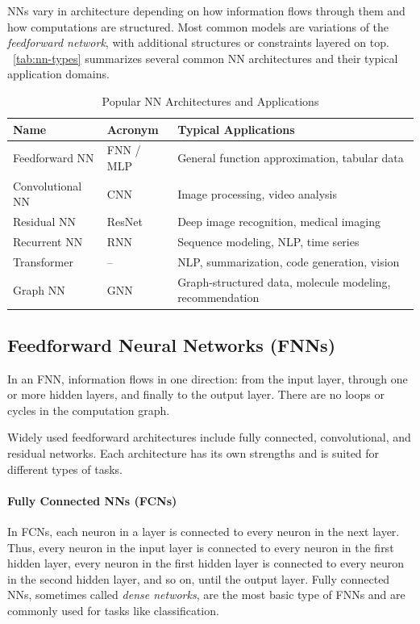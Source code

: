\documentclass[oneside,11pt,dvipsnames]{book}
\numberwithin{equation}{section}
\theoremstyle{definition}
\theoremstyle{remark}
\begin{document}
NNs vary in architecture depending on how information flows through them and how computations are structured. Most common models are variations of the \emph{feedforward network}, with additional structures or constraints layered on top. ~\autoref{tab:nn-types} summarizes several common NN architectures and their typical application domains.


\begin{table}[h]
\caption{Popular NN Architectures and Applications}\label{tab:nn-types}
\centering
\small
\begin{tabular}{llp{8cm}@{}}
\toprule
\textbf{Name} & \textbf{Acronym} & \textbf{Typical Applications} \\
\midrule
Feedforward NN & FNN / MLP & General function approximation, tabular data \\
Convolutional NN & CNN & Image processing, video analysis \\
Residual NN & ResNet & Deep image recognition, medical imaging \\
Recurrent NN & RNN & Sequence modeling, NLP, time series \\
Transformer & -- & NLP, summarization, code generation, vision \\
Graph NN & GNN & Graph-structured data, molecule modeling, recommendation \\
\bottomrule
\end{tabular}
\end{table}

\subsection{Feedforward Neural Networks (FNNs)}\label{sec:ffn}

In an FNN, information flows in one direction: from the input layer, through one or more hidden layers, and finally to the output layer. There are no loops or cycles in the computation graph.

Widely used feedforward architectures include fully connected, convolutional, and residual networks. Each architecture has its own strengths and is suited for different types of tasks.

\paragraph{Fully Connected NNs (FCNs)}

In FCNs, each neuron in a layer is connected to every neuron in the next layer. Thus, every neuron in the input layer is connected to every neuron in the first hidden layer, every neuron in the first hidden layer is connected to every neuron in the second hidden layer, and so on, until the output layer. Fully connected NNs, sometimes called \emph{dense networks}, are the most basic type of FNNs and are commonly used for tasks like classification.
\end{document}
